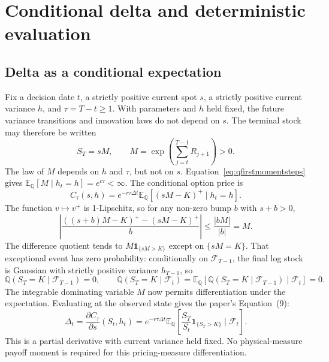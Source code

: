 \documentclass[11pt,a4paper]{article}
\newcommand{\E}{\mathbb E}
\newcommand{\Q}{\mathbb Q}
\newcommand{\F}{\mathcal F}
\newcommand{\ind}{\mathbf 1}
\newcommand{\dt}{\Delta t}
\theoremstyle{remark}
\begin{document}
\section{Conditional delta and deterministic evaluation}
\subsection{Delta as a conditional expectation}
Fix a decision date $t$, a strictly positive current spot $s$, a strictly positive current variance $h$, and $\tau=T-t\geq1$. With parameters and $h$ held fixed, the future variance transitions and innovation laws do not depend on $s$. The terminal stock may therefore be written
\begin{equation}
 S_T=sM,\qquad
 M=\exp\!\left(\sum_{j=t}^{T-1}R_{j+1}\right)>0.
\end{equation}
The law of $M$ depends on $h$ and $\tau$, but not on $s$. Equation~\eqref{eq:qfirstmomentsteps} gives $\E_{\Q}[M\mid h_t=h]=e^{c\tau}<\infty$. The conditional option price is
\begin{equation}
 C_\tau(s,h)=e^{-r\tau\dt}\E_{\Q}[(sM-K)^+\mid h_t=h].
\end{equation}
The function $v\mapsto v^+$ is 1-Lipschitz, so for any non-zero bump $b$ with $s+b>0$,
\begin{equation}
 \left|\frac{((s+b)M-K)^+-(sM-K)^+}{b}\right|
 \leq \frac{|bM|}{|b|}=M.
\end{equation}
The difference quotient tends to $M\ind_{\{sM>K\}}$ except on $\{sM=K\}$. That exceptional event has zero probability: conditionally on $\F_{T-1}$, the final log stock is Gaussian with strictly positive variance $h_{T-1}$, so
\begin{equation}
 \Q(S_T=K\mid\F_{T-1})=0,
 \qquad
 \Q(S_T=K\mid\F_t)=
 \E_{\Q}[\Q(S_T=K\mid\F_{T-1})\mid\F_t]=0.
\end{equation}
The integrable dominating variable $M$ now permits differentiation under the expectation. Evaluating at the observed state gives the paper's Equation~(9):
\begin{equation}
 \Delta_t=\frac{\partial C_\tau}{\partial s}(S_t,h_t)
 =e^{-r\tau\dt}\E_{\Q}\!\left[
        \frac{S_T}{S_t}\ind_{\{S_T>K\}}\mid\F_t\right].
 \label{eq:delta}
\end{equation}
This is a partial derivative with current variance held fixed. No physical-measure payoff moment is required for this pricing-measure differentiation.
\end{document}
